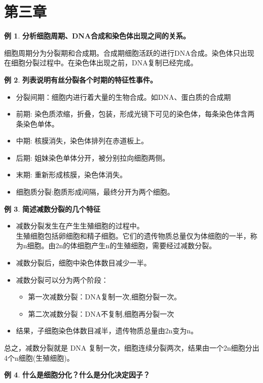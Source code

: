 \documentclass[UTF8]{article}
\theoremstyle{definition}
\newtheorem{example}{例}[section]
\begin{document}
\section{第三章}
\begin{example}\textbf{分析细胞周期、DNA合成和染色体出现之间的关系。}
    
    细胞周期分为分裂期和合成期。合成期细胞活跃的进行DNA合成。染色体只出现在细胞分裂过程中。在染色体出现之前，DNA复制已经完成。
\end{example}\begin{example}\textbf{列表说明有丝分裂各个时期的特征性事件。}
    
    \begin{itemize}
        \item 分裂间期：细胞内进行着大量的生物合成。如DNA、蛋白质的合成期
        \item 前期: 染色质浓缩，折叠，包装，形成光镜下可见的染色体，每条染色体含两条染色单体。
        \item 中期: 核膜消失，染色体排列在赤道板上。
        \item 后期: 姐妹染色单体分开，被分别拉向细胞两侧。
        \item 末期: 重新形成核膜，染色体消失。
        \item 细胞质分裂:胞质形成间隔，最终分开为两个细胞。
    \end{itemize}
\end{example}\begin{example}\textbf{简述减数分裂的几个特征}
    
    \begin{itemize}
        \item 减数分裂发生在产生生殖细胞的过程中。\\ 生殖细胞包括卵细胞和精子细胞。它们的遗传物质总量仅为体细胞的一半，称为n细胞。由2n的体细胞产生n的生殖细胞，需要经过减数分裂。
        \item 减数分裂后，细胞中染色体数目减少一半。
        \item 减数分裂可以分为两个阶段：\begin{itemize}
            \item 第一次减数分裂：DNA复制一次,细胞分裂一次。 \item 第二次减数分裂：DNA不复制,细胞再分裂一次
        \end{itemize}
        \item 结果，子细胞染色体数目减半，遗传物质总量由2n变为n。
    \end{itemize}
    总之，减数分裂就是 DNA 复制一次，细胞连续分裂两次，结果由一个2n细胞分出4个n细胞(生殖细胞)。
\end{example}\begin{example}\textbf{什么是细胞分化？什么是分化决定因子？}
    

\end{example}
\end{document}
